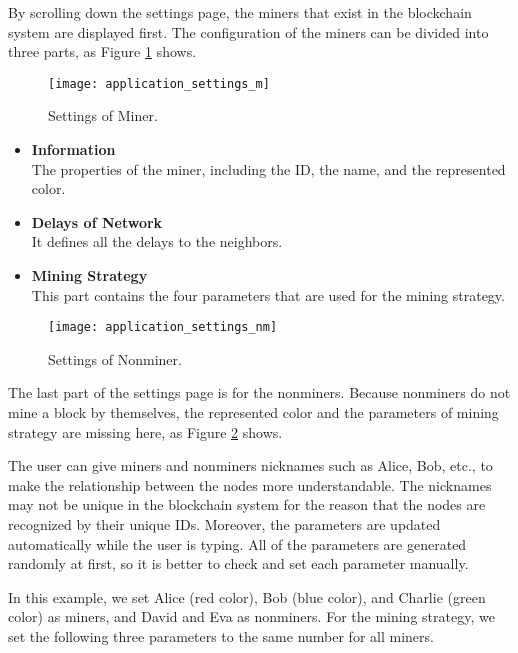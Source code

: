 By scrolling down the settings page, the miners that exist in the blockchain system are displayed first. The configuration of the miners can be divided into three parts, as Figure \ref{fig:settings of miner} shows.

\clearpage

\begin{figure}[htb]
    \centering
    \texttt{[image: application\_settings\_m]}
    \caption{Settings of Miner.}
    \label{fig:settings of miner}
\end{figure}

\begin{itemize}
    \item \textbf{Information} \\
        The properties of the miner, including the ID, the name, and the represented color.
    \item \textbf{Delays of Network} \\
        It defines all the delays to the neighbors.
    \item \textbf{Mining Strategy} \\
        This part contains the four parameters that are used for the mining strategy.
\end{itemize}

\begin{figure}[htb]
    \centering
    \texttt{[image: application\_settings\_nm]}
    \caption{Settings of Nonminer.}
    \label{fig:settings of nonminer}
\end{figure}

The last part of the settings page is for the nonminers. Because nonminers do not mine a block by themselves, the represented color and the parameters of mining strategy are missing here, as Figure \ref{fig:settings of nonminer} shows.

The user can give miners and nonminers nicknames such as Alice, Bob, etc., to make the relationship between the nodes more understandable. The nicknames may not be unique in the blockchain system for the reason that the nodes are recognized by their unique IDs. Moreover, the parameters are updated automatically while the user is typing. All of the parameters are generated randomly at first, so it is better to check and set each parameter manually.

In this example, we set Alice (red color), Bob (blue color), and Charlie (green color) as miners, and David and Eva as nonminers. For the mining strategy, we set the following three parameters to the same number for all miners.

